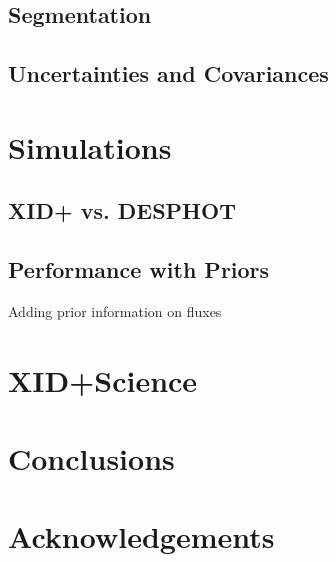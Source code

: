 \documentclass[useAMS,usenatbib]{mn2e}
\begin{document}
\subsection{Segmentation}
\subsection{Uncertainties and Covariances}
\section{Simulations}
\subsection{XID+ vs. DESPHOT}
\subsection{Performance with Priors}
Adding prior information on fluxes 
\section{XID+Science}
\section{Conclusions}



\section*{Acknowledgements} %
%
%
%


%
%
%
%
%
%
%
\end{document}
